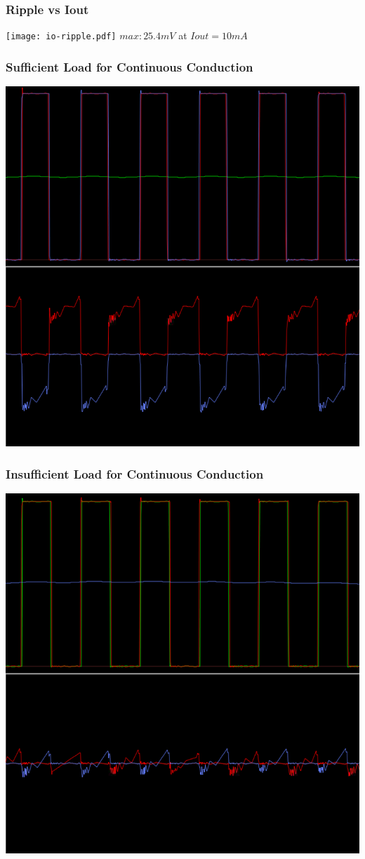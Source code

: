 \documentclass{beamer}
\begin{document}
\begin{frame}
  \frametitle{Ripple vs Iout}
  \texttt{[image: io-ripple.pdf]}
  $max: 25.4 mV$ at $Iout = 10 mA$
\end{frame}

\begin{frame}
    \begin{center}
      \frametitle{Sufficient Load for Continuous Conduction}
      \includegraphics[scale=0.3]{buck_working.png}
    \end{center}
\end{frame}

\begin{frame}
    \begin{center}
      \frametitle{Insufficient Load for Continuous Conduction}
      \includegraphics[scale=0.3]{buck_not_working.png}
    \end{center}
\end{frame}
\end{document}
